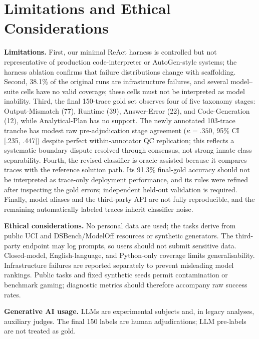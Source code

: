 \section{Limitations and Ethical Considerations}
\label{sec:limits-ethics}

\textbf{Limitations.} First, our minimal ReAct harness is controlled but not representative of production code-interpreter or AutoGen-style systems; the harness ablation confirms that failure distributions change with scaffolding. Second, 38.1\% of the original runs are infrastructure failures, and several model--suite cells have no valid coverage; these cells must not be interpreted as model inability. Third, the final 150-trace gold set observes four of five taxonomy stages: Output-Mismatch (77), Runtime (39), Answer-Error (22), and Code-Generation (12), while Analytical-Plan has no support. The newly annotated 103-trace tranche has modest raw pre-adjudication stage agreement ($\kappa=.350$, 95\% CI [.235, .447]) despite perfect within-annotator QC replication; this reflects a systematic boundary dispute resolved through consensus, not strong innate class separability. Fourth, the revised classifier is oracle-assisted because it compares traces with the reference solution path. Its 91.3\% final-gold accuracy should not be interpreted as trace-only deployment performance, and its rules were refined after inspecting the gold errors; independent held-out validation is required. Finally, model aliases and the third-party API are not fully reproducible, and the remaining automatically labeled traces inherit classifier noise.

\textbf{Ethical considerations.} No personal data are used; the tasks derive from public UCI and DSBench/ModelOff resources or synthetic generators. The third-party endpoint may log prompts, so users should not submit sensitive data. Closed-model, English-language, and Python-only coverage limits generalisability. Infrastructure failures are reported separately to prevent misleading model rankings. Public tasks and fixed synthetic seeds permit contamination or benchmark gaming; diagnostic metrics should therefore accompany raw success rates.

\textbf{Generative AI usage.} LLMs are experimental subjects and, in legacy analyses, auxiliary judges. The final 150 labels are human adjudications; LLM pre-labels are not treated as gold.
